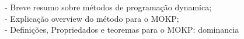 - Breve resumo sobre métodos de programação dynamica; \\
- Explicação overview do método para o MOKP; \\
- Definições, Propriedados e teoremas para o MOKP: dominancia \\
